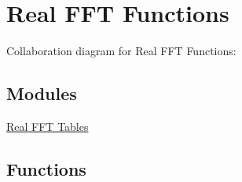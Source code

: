 \hypertarget{group__RealFFT}{}\section{Real F\+FT Functions}
\label{group__RealFFT}
Collaboration diagram for Real F\+FT Functions\+:
\subsection*{Modules}
\begin{DoxyCompactItemize}
\item 
\hyperlink{group__RealFFT__Table}{Real F\+F\+T Tables}
\end{DoxyCompactItemize}
\subsection*{Functions}
